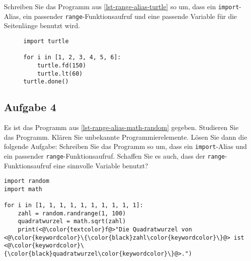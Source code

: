 Schreiben Sie das Programm aus \autoref{lst-range-alias-turtle} so um, dass ein \lstinline{import}-Alias, ein passender \lstinline{range}-Funktionsaufruf und eine passende Variable für die Seitenlänge benutzt wird.

\begin{figure}[htb]
\begin{minipage}{0.45\textwidth}
\fillwithgrid{2in}
\end{minipage}
\hfill
\begin{minipage}{0.5\textwidth}
\begin{lstlisting}[caption={Es wird ein regelmässiges \num{6}-Eck mit der Seitenlänge 150 gezeichnet.}, label={lst-range-alias-turtle}]
import turtle

for i in [1, 2, 3, 4, 5, 6]:
    turtle.fd(150)
    turtle.lt(60)
turtle.done()
\end{lstlisting}
\end{minipage}
\end{figure}

\subsection{Aufgabe 4}

Es ist das Programm aus \autoref{lst-range-alias-math-random} gegeben. Studieren Sie das Programm. Klären Sie unbekannte Programmierelemente. Lösen Sie dann die folgende Aufgabe: Schreiben Sie das Programm so um, dass ein \lstinline{import}-Alias und ein passender \lstinline{range}-Funktionsaufruf. Schaffen Sie es auch, dass der \lstinline{range}-Funktionsaufruf eine sinnvolle Variable benutzt?

\begin{lstlisting}[caption={Es werden Quadratwurzeln berechnet.}, label={lst-range-alias-math-random}]
import random
import math

for i in [1, 1, 1, 1, 1, 1, 1, 1, 1, 1]:
    zahl = random.randrange(1, 100)
    quadratwurzel = math.sqrt(zahl)
    print(<@\color{textcolor}f@>"Die Quadratwurzel von <@\color{keywordcolor}\{\color{black}zahl\color{keywordcolor}\}@> ist <@\color{keywordcolor}\{\color{black}quadratwurzel\color{keywordcolor}\}@>.")
\end{lstlisting}

